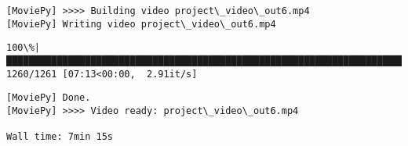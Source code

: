 \documentclass[11pt]{article}
\begin{document}
    \begin{Verbatim}[commandchars=\\\{\}]
[MoviePy] >>>> Building video project\_video\_out6.mp4
[MoviePy] Writing video project\_video\_out6.mp4

    \end{Verbatim}

    \begin{Verbatim}[commandchars=\\\{\}]
100\%|█████████████████████████████████████████████████████████████████████████████▉| 1260/1261 [07:13<00:00,  2.91it/s]

    \end{Verbatim}

    \begin{Verbatim}[commandchars=\\\{\}]
[MoviePy] Done.
[MoviePy] >>>> Video ready: project\_video\_out6.mp4 

Wall time: 7min 15s

    \end{Verbatim}


    
    
    
    
\end{document}

